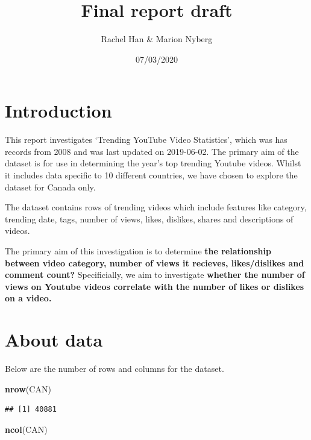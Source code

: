 \documentclass[]{article}
\title{Final report draft}
\author{Rachel Han \& Marion Nyberg}
\date{07/03/2020}
\newenvironment{Shaded}{\begin{snugshade}}{\end{snugshade}}
\newcommand{\KeywordTok}[1]{\textcolor[rgb]{0.13,0.29,0.53}{\textbf{#1}}}
\newcommand{\NormalTok}[1]{#1}
\begin{document}
\maketitle

{
\setcounter{tocdepth}{2}
\tableofcontents
}
\hypertarget{introduction}{%
\section{Introduction}\label{introduction}}

This report investigates `Trending YouTube Video Statistics', which was
has records from 2008 and was last updated on 2019-06-02. The primary
aim of the dataset is for use in determining the year's top trending
Youtube videos. Whilst it includes data specific to 10 different
countries, we have chosen to explore the dataset for Canada only.

The dataset contains rows of trending videos which include features like
category, trending date, tags, number of views, likes, dislikes, shares
and descriptions of videos.

The primary aim of this investigation is to determine \textbf{the
relationship between video category, number of views it recieves,
likes/dislikes and comment count?} Specificially, we aim to investigate
\textbf{whether the number of views on Youtube videos correlate with the
number of likes or dislikes on a video.}

\hypertarget{about-data}{%
\section{About data}\label{about-data}}

Below are the number of rows and columns for the dataset.

\begin{Shaded}
\begin{Highlighting}[]
\KeywordTok{nrow}\NormalTok{(CAN) }
\end{Highlighting}
\end{Shaded}

\begin{verbatim}
## [1] 40881
\end{verbatim}

\begin{Shaded}
\begin{Highlighting}[]
\KeywordTok{ncol}\NormalTok{(CAN)}
\end{Highlighting}
\end{Shaded}
\end{document}
